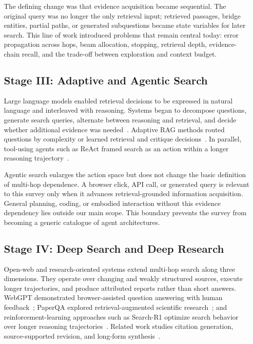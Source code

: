 The defining change was that evidence acquisition became sequential. The original query was no longer the only retrieval input; retrieved passages, bridge entities, partial paths, or generated subquestions became state variables for later search. This line of work introduced problems that remain central today: error propagation across hops, beam allocation, stopping, retrieval depth, evidence-chain recall, and the trade-off between exploration and context budget.

\subsection{Stage III: Adaptive and Agentic Search}

Large language models enabled retrieval decisions to be expressed in natural language and interleaved with reasoning. Systems began to decompose questions, generate search queries, alternate between reasoning and retrieval, and decide whether additional evidence was needed~\cite{press2022selfask,khot2023decomposed,trivedi2023ircot,jiang2023flare}. Adaptive RAG methods routed questions by complexity or learned retrieval and critique decisions~\cite{asai2024selfrag,jeong2024adaptiverag,su2024dragin}. In parallel, tool-using agents such as ReAct framed search as an action within a longer reasoning trajectory~\cite{yao2023react}.

Agentic search enlarges the action space but does not change the basic definition of multi-hop dependence. A browser click, API call, or generated query is relevant to this survey only when it advances retrieval-grounded information acquisition. General planning, coding, or embodied interaction without this evidence dependency lies outside our main scope. This boundary prevents the survey from becoming a generic catalogue of agent architectures.

\subsection{Stage IV: Deep Search and Deep Research}

Open-web and research-oriented systems extend multi-hop search along three dimensions. They operate over changing and weakly structured sources, execute longer trajectories, and produce attributed reports rather than short answers. WebGPT demonstrated browser-assisted question answering with human feedback~\cite{nakano2021webgpt}; PaperQA explored retrieval-augmented scientific research~\cite{lala2023paperqa}; and reinforcement-learning approaches such as Search-R1 optimize search behavior over longer reasoning trajectories~\cite{jin2025searchr1}. Related work studies citation generation, source-supported revision, and long-form synthesis~\cite{gao2023alce,gao2023rarr}.


